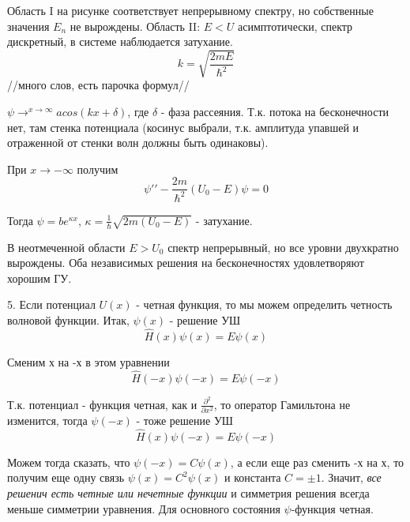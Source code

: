 \par Область I на рисунке соответствует непрерывному спектру, но собственные значения $E_n$ не вырождены. Область II: $E<U$ асимптотически, спектр дискретный, в системе наблюдается затухание.
$$k=\sqrt{\frac{2mE}{\hbar^2}}$$
//много слов, есть парочка формул//
\par $\psi \rightarrow^{x \rightarrow \infty} a cos(kx+\delta) $, где $\delta$  - фаза рассеяния. Т.к. потока на бесконечности нет, там стенка потенциала (косинус выбрали, т.к. амплитуда упавшей и отраженной от стенки волн должны быть одинаковы).
\par При $x \rightarrow -\infty$ получим 
$$\psi\prime\prime - \frac{2m}{\hbar^2}(U_0 - E)\psi =0$$
\par Тогда $\psi = b e^{\kappa x}$, $\kappa = \frac{1}{\hbar}\sqrt{2m(U_0-E)}$ - затухание.
\par В неотмеченной области $E>U_0$ спектр непрерывный, но все уровни двухкратно вырождены. Оба независимых решения на бесконечностях удовлетворяют хорошим ГУ.
\par 5\textdegree. Если потенциал $U(x)$ - четная функция, то мы можем определить четность волновой функции. Итак, $\psi(x)$ - решение УШ
$$\hat{H}(x)\psi(x)=E\psi(x)$$
\par Сменим х на -х в этом уравнении
$$\hat{H}(-x)\psi(-x)=E\psi(-x)$$
\par Т.к. потенциал - функция четная, как и $\frac{\partial^2}{\partial x^2}$, то оператор Гамильтона не изменится, тогда $\psi(-x)$ - тоже решение УШ
$$\hat{H}(x)\psi(-x)=E\psi(-x)$$

\par Можем тогда сказать, что $\psi(-x)=C \psi(x)$, а если еще раз сменить -х на х, то получим еще одну связь $\psi(x)=C^2\psi(x)$ и константа $C=\pm 1$. Значит, \textit{все решенич есть четные или нечетные функции} и симметрия решения всегда меньше симметрии уравнения. Для основного состояния $\psi$-функция четная.

